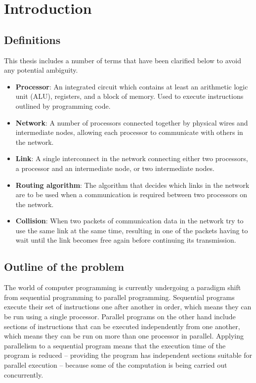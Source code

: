 \documentclass[a4paper, 12pt]{article}
\begin{document}
\newpage
\section{Introduction}

\subsection{Definitions}

This thesis includes a number of terms that have been clarified below to avoid any potential ambiguity.
\begin{itemize}[leftmargin=0cm]

\item[] \textbf{Processor}: An integrated circuit which contains at least an arithmetic logic unit (ALU), registers, and a block of memory. Used to execute instructions outlined by programming code.

\item[] \textbf{Network}: A number of processors connected together by physical wires and intermediate nodes, allowing each processor to communicate with others in the network.

\item[] \textbf{Link}: A single interconnect in the network connecting either two processors, a processor and an intermediate node, or two intermediate nodes.

\item[] \textbf{Routing algorithm}: The algorithm that decides which links in the network are to be used when a communication is required between two processors on the network.

\item[] \textbf{Collision}: When two packets of communication data in the network try to use the same link at the same time, resulting in one of the packets having to wait until the link becomes free again before continuing its transmission.

\end{itemize}

\subsection{Outline of the problem}
\label{sec:problem_outline}

The world of computer programming is currently undergoing a paradigm shift from sequential programming to parallel programming. Sequential programs execute their set of instructions one after another in order, which means they can be run using a single processor. Parallel programs on the other hand include sections of instructions that can be executed independently from one another, which means they can be run on more than one processor in parallel. Applying parallelism to a sequential program means that the execution time of the program is reduced -- providing the program has independent sections suitable for parallel execution -- because some of the computation is being carried out concurrently.
\end{document}
